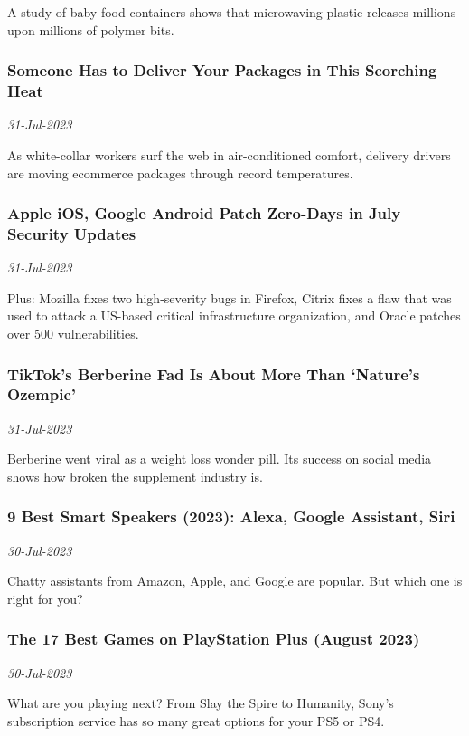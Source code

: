 A study of baby-food containers shows that microwaving plastic releases millions upon millions of polymer bits.
\subsubsection{Someone Has to Deliver Your Packages in This Scorching Heat \href{https://www.wired.com/story/someone-has-to-deliver-your-packages-in-this-scorching-heat/}{}}
\textit{31-Jul-2023}

As white-collar workers surf the web in air-conditioned comfort, delivery drivers are moving ecommerce packages through record temperatures.
\subsubsection{Apple iOS, Google Android Patch Zero-Days in July Security Updates \href{https://www.wired.com/story/apple-google-microsoft-zero-day-fix-july-2023/}{}}
\textit{31-Jul-2023}

Plus: Mozilla fixes two high-severity bugs in Firefox, Citrix fixes a flaw that was used to attack a US-based critical infrastructure organization, and Oracle patches over 500 vulnerabilities.
\subsubsection{TikTok’s Berberine Fad Is About More Than ‘Nature's Ozempic’ \href{https://www.wired.com/story/berberine-social-media-trend/}{}}
\textit{31-Jul-2023}

Berberine went viral as a weight loss wonder pill. Its success on social media shows how broken the supplement industry is.
\subsubsection{9 Best Smart Speakers (2023): Alexa, Google Assistant, Siri \href{https://www.wired.com/story/best-smart-speakers/}{}}
\textit{30-Jul-2023}

Chatty assistants from Amazon, Apple, and Google are popular. But which one is right for you?
\subsubsection{The 17 Best Games on PlayStation Plus (August 2023) \href{https://www.wired.com/gallery/best-playstation-ps-plus-games-extra-premium/}{}}
\textit{30-Jul-2023}

What are you playing next? From Slay the Spire to Humanity, Sony’s subscription service has so many great options for your PS5 or PS4.
